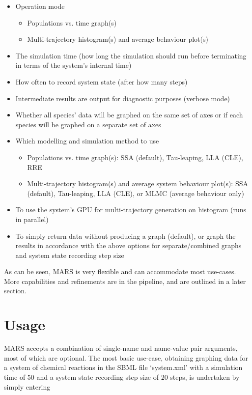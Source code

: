 \documentclass[ugrad,lot,lof,openright,11pt,oneside,onehalfspace]{RUthesis}
\begin{document}
		\begin{itemize}
		\item Operation mode
			\begin{itemize}
				\item Populations vs. time graph(s)
				\item Multi-trajectory histogram(s) and average behaviour plot(s)
			\end{itemize}
		\item The simulation time (how long the simulation should run before terminating in terms of the system's internal time)
		\item How often to record system state (after how many steps)
		\item Intermediate results are output for diagnostic purposes (verbose mode)
		\item Whether all species' data will be graphed on the same set of axes or if each species will be graphed on a separate set of axes
		\item Which modelling and simulation method to use
			\begin{itemize}
			\item Populations vs. time graph(s): SSA (default), Tau-leaping, LLA (CLE), RRE
			\item Multi-trajectory histogram(s) and average system behaviour plot(s): SSA (default), Tau-leaping, LLA (CLE), or MLMC (average behaviour only)
			\end{itemize}
		\item To use the system's GPU for multi-trajectory generation on histogram (runs in parallel)
		\item To simply return data without producing a graph (default), or graph the results in accordance with the above options for separate/combined graphs and system state recording step size
		\end{itemize}

		\noindent
		As can be seen, MARS is very flexible and can accommodate most use-cases. More capabilities and refinements are in the pipeline, and are outlined in a later section.

	\section{Usage}

		MARS accepts a combination of single-name and name-value pair arguments, most of which are optional. The most basic use-case, obtaining graphing data for a system of chemical reactions in the SBML file `system.xml' with a simulation time of 50 and a system state recording step size of 20 steps, is undertaken by simply entering
\end{document}
